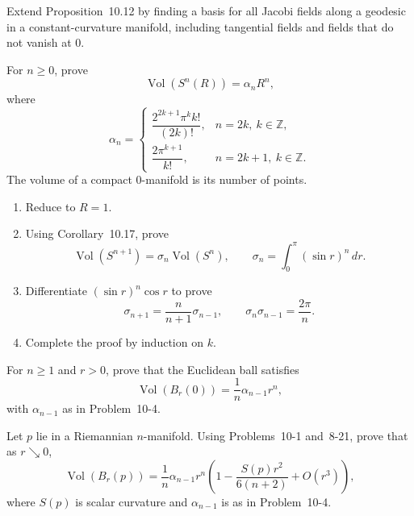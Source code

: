 \begin{exercise}
\label{prob:jacobi-fields-constant-curvature}

Extend Proposition~10.12 by finding a basis for all Jacobi fields along a
geodesic in a constant-curvature manifold, including tangential fields and
fields that do not vanish at $0$.
\end{exercise}

\begin{exercise}
\label{prob:volume-formula-spheres}

For $n\geq0$, prove
\[
\operatorname{Vol}(S^n(R))=\alpha_nR^n,
\]
where
\[
\alpha_n=
\begin{cases}
\dfrac{2^{2k+1}\pi^kk!}{(2k)!},
& n=2k,\ k\in\mathbb Z,\\
\dfrac{2\pi^{k+1}}{k!},
& n=2k+1,\ k\in\mathbb Z.
\end{cases}
\]
The volume of a compact $0$-manifold is its number of points.
\begin{enumerate}
\item[(a)] Reduce to $R=1$.
\item[(b)] Using Corollary~10.17, prove
\[
\operatorname{Vol}(S^{n+1})=\sigma_n\operatorname{Vol}(S^n),
\qquad
\sigma_n=\int_0^\pi(\sin r)^n\,dr.
\]
\item[(c)] Differentiate $(\sin r)^n\cos r$ to prove
\[
\sigma_{n+1}=\frac{n}{n+1}\sigma_{n-1},
\qquad
\sigma_n\sigma_{n-1}=\frac{2\pi}{n}.
\]
\item[(d)] Complete the proof by induction on $k$.
\end{enumerate}
\end{exercise}

\begin{exercise}
\label{prob:volume-euclidean-balls}

For $n\geq1$ and $r>0$, prove that the Euclidean ball satisfies
\[
\operatorname{Vol}(B_r(0))=\frac1n\alpha_{n-1}r^n,
\]
with $\alpha_{n-1}$ as in Problem~10-4.
\end{exercise}

\begin{exercise}
\label{prob:asymptotic-volume-geodesic-balls}

Let $p$ lie in a Riemannian $n$-manifold. Using Problems~10-1 and~8-21,
prove that as $r\searrow0$,
\[
\operatorname{Vol}(B_r(p))
=\frac1n\alpha_{n-1}r^n
\left(
1-\frac{S(p)r^2}{6(n+2)}+O(r^3)
\right),
\]
where $S(p)$ is scalar curvature and $\alpha_{n-1}$ is as in Problem~10-4.
\end{exercise}

